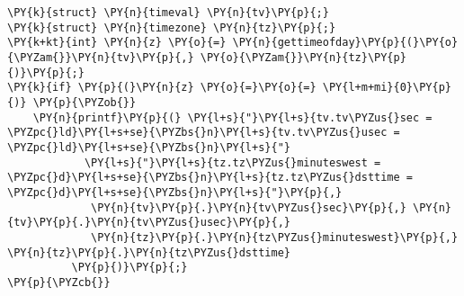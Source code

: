 \begin{Verbatim}[commandchars=\\\{\}]
\PY{k}{struct} \PY{n}{timeval} \PY{n}{tv}\PY{p}{;}
\PY{k}{struct} \PY{n}{timezone} \PY{n}{tz}\PY{p}{;}
\PY{k+kt}{int} \PY{n}{z} \PY{o}{=} \PY{n}{gettimeofday}\PY{p}{(}\PY{o}{\PYZam{}}\PY{n}{tv}\PY{p}{,} \PY{o}{\PYZam{}}\PY{n}{tz}\PY{p}{)}\PY{p}{;}
\PY{k}{if} \PY{p}{(}\PY{n}{z} \PY{o}{=}\PY{o}{=} \PY{l+m+mi}{0}\PY{p}{)} \PY{p}{\PYZob{}}
    \PY{n}{printf}\PY{p}{(} \PY{l+s}{"}\PY{l+s}{tv.tv\PYZus{}sec = \PYZpc{}ld}\PY{l+s+se}{\PYZbs{}n}\PY{l+s}{tv.tv\PYZus{}usec = \PYZpc{}ld}\PY{l+s+se}{\PYZbs{}n}\PY{l+s}{"}
            \PY{l+s}{"}\PY{l+s}{tz.tz\PYZus{}minuteswest = \PYZpc{}d}\PY{l+s+se}{\PYZbs{}n}\PY{l+s}{tz.tz\PYZus{}dsttime = \PYZpc{}d}\PY{l+s+se}{\PYZbs{}n}\PY{l+s}{"}\PY{p}{,}
             \PY{n}{tv}\PY{p}{.}\PY{n}{tv\PYZus{}sec}\PY{p}{,} \PY{n}{tv}\PY{p}{.}\PY{n}{tv\PYZus{}usec}\PY{p}{,}
             \PY{n}{tz}\PY{p}{.}\PY{n}{tz\PYZus{}minuteswest}\PY{p}{,} \PY{n}{tz}\PY{p}{.}\PY{n}{tz\PYZus{}dsttime}
          \PY{p}{)}\PY{p}{;}
\PY{p}{\PYZcb{}}
\end{Verbatim}

